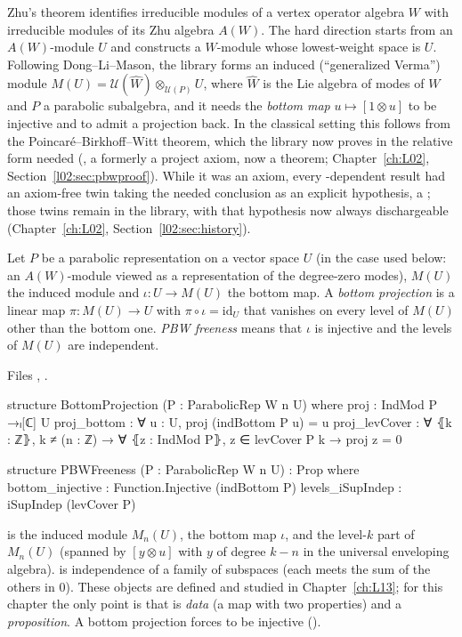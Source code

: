 Zhu's theorem identifies irreducible modules of a vertex operator algebra $W$ with irreducible modules of
its Zhu algebra $A(W)$. The hard direction starts from an $A(W)$-module $U$ and constructs a $W$-module
whose lowest-weight space is $U$. Following Dong--Li--Mason, the library forms an induced (``generalized
Verma'') module $M(U)=\mathcal U(\hat W)\otimes_{\mathcal U(P)}U$, where $\hat W$ is the Lie algebra of modes
of $W$ and $P$ a parabolic subalgebra, and it needs the \emph{bottom map} $u\mapsto[1\otimes u]$ to be
injective and to admit a projection back. In the classical setting this follows from the
Poincar\'e--Birkhoff--Witt theorem, which the library now proves in the relative form needed (, a
formerly a project axiom, now a theorem; Chapter~\ref{ch:L02}, Section~\ref{l02:sec:pbwproof}). While it was an axiom,
every -dependent result had an axiom-free twin taking the needed conclusion as an explicit hypothesis, a
; those twins remain in the library, with that hypothesis now always dischargeable
(Chapter~\ref{ch:L02}, Section~\ref{l02:sec:history}).

\begin{definition}\label{l05:def:bottomproj}
Let $P$ be a parabolic representation on a vector space $U$ (in the case used below: an $A(W)$-module viewed
as a representation of the degree-zero modes), $M(U)$ the induced module and $\iota:U\to M(U)$ the bottom
map. A \emph{bottom projection} is a linear map $\pi:M(U)\to U$ with $\pi\circ\iota=\mathrm{id}_U$ that
vanishes on every level of $M(U)$ other than the bottom one. \emph{PBW freeness} means that $\iota$ is
injective and the levels of $M(U)$ are independent.
\end{definition}

\noindent Files ,
.
\begin{leancode}
structure BottomProjection (P : ParabolicRep W n U) where
  proj : IndMod P →ₗ[ℂ] U
  proj_bottom : ∀ u : U, proj (indBottom P u) = u
  proj_levCover : ∀ ⦃k : ℤ⦄, k ≠ (n : ℤ) → ∀ ⦃z : IndMod P⦄, z ∈ levCover P k → proj z = 0

structure PBWFreeness (P : ParabolicRep W n U) : Prop where
  bottom_injective : Function.Injective (indBottom P)
  levels_iSupIndep : iSupIndep (levCover P)
\end{leancode}

\begin{dictionary}
 is the induced module $M_n(U)$,  the bottom map $\iota$, and
 the level-$k$ part of $M_n(U)$ (spanned by $[y\otimes u]$ with $y$ of degree $k-n$ in the
universal enveloping algebra).  is independence of a family of subspaces (each meets the sum
of the others in $0$). These objects are defined and studied in Chapter~\ref{ch:L13}; for this chapter the
only point is that  is \emph{data} (a map with two properties) and  a
\emph{proposition}. A bottom projection forces  to be injective
().
\end{dictionary}

